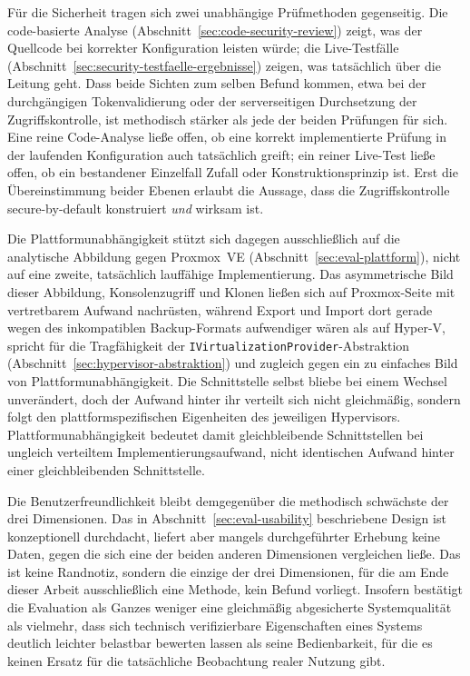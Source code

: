 \documentclass[12pt,a4paper]{article}
\begin{document}
Für die Sicherheit tragen sich zwei unabhängige Prüfmethoden gegenseitig. Die code-basierte Analyse (Abschnitt~\ref{sec:code-security-review}) zeigt, was der Quellcode bei korrekter Konfiguration leisten würde; die Live-Testfälle (Abschnitt~\ref{sec:security-testfaelle-ergebnisse}) zeigen, was tatsächlich über die Leitung geht. Dass beide Sichten zum selben Befund kommen, etwa bei der durchgängigen Tokenvalidierung oder der serverseitigen Durchsetzung der Zugriffskontrolle, ist methodisch stärker als jede der beiden Prüfungen für sich. Eine reine Code-Analyse ließe offen, ob eine korrekt implementierte Prüfung in der laufenden Konfiguration auch tatsächlich greift; ein reiner Live-Test ließe offen, ob ein bestandener Einzelfall Zufall oder Konstruktionsprinzip ist. Erst die Übereinstimmung beider Ebenen erlaubt die Aussage, dass die Zugriffskontrolle secure-by-default konstruiert \emph{und} wirksam ist.

Die Plattformunabhängigkeit stützt sich dagegen ausschließlich auf die analytische Abbildung gegen Proxmox~VE (Abschnitt~\ref{sec:eval-plattform}), nicht auf eine zweite, tatsächlich lauffähige Implementierung. Das asymmetrische Bild dieser Abbildung, Konsolenzugriff und Klonen ließen sich auf Proxmox-Seite mit vertretbarem Aufwand nachrüsten, während Export und Import dort gerade wegen des inkompatiblen Backup-Formats aufwendiger wären als auf Hyper-V, spricht für die Tragfähigkeit der \texttt{IVirtualizationProvider}-Abstraktion (Abschnitt~\ref{sec:hypervisor-abstraktion}) und zugleich gegen ein zu einfaches Bild von Plattformunabhängigkeit. Die Schnittstelle selbst bliebe bei einem Wechsel unverändert, doch der Aufwand hinter ihr verteilt sich nicht gleichmäßig, sondern folgt den plattformspezifischen Eigenheiten des jeweiligen Hypervisors. Plattformunabhängigkeit bedeutet damit gleichbleibende Schnittstellen bei ungleich verteiltem Implementierungsaufwand, nicht identischen Aufwand hinter einer gleichbleibenden Schnittstelle.

Die Benutzerfreundlichkeit bleibt demgegenüber die methodisch schwächste der drei Dimensionen. Das in Abschnitt~\ref{sec:eval-usability} beschriebene Design ist konzeptionell durchdacht, liefert aber mangels durchgeführter Erhebung keine Daten, gegen die sich eine der beiden anderen Dimensionen vergleichen ließe. Das ist keine Randnotiz, sondern die einzige der drei Dimensionen, für die am Ende dieser Arbeit ausschließlich eine Methode, kein Befund vorliegt. Insofern bestätigt die Evaluation als Ganzes weniger eine gleichmäßig abgesicherte Systemqualität als vielmehr, dass sich technisch verifizierbare Eigenschaften eines Systems deutlich leichter belastbar bewerten lassen als seine Bedienbarkeit, für die es keinen Ersatz für die tatsächliche Beobachtung realer Nutzung gibt.
\end{document}
